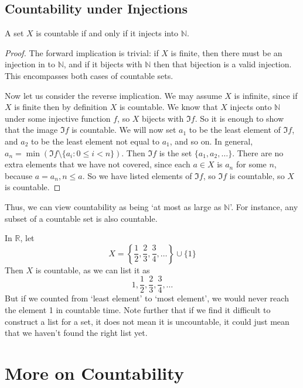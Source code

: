 \documentclass{article}
\begin{document}
\subsection{Countability under Injections}
\begin{proposition}
	A set $X$ is countable if and only if it injects into $\mathbb N$.
\end{proposition}
\begin{proof}
	The forward implication is trivial: if $X$ is finite, then there must be an injection in to $\mathbb N$, and if it bijects with $\mathbb N$ then that bijection is a valid injection. This encompasses both cases of countable sets.

	Now let us consider the reverse implication. We may assume $X$ is infinite, since if $X$ is finite then by definition $X$ is countable. We know that $X$ injects onto $\mathbb N$ under some injective function $f$, so $X$ bijects with $\Im f$. So it is enough to show that the image $\Im f$ is countable. We will now set $a_1$ to be the least element of $\Im f$, and $a_2$ to be the least element not equal to $a_1$, and so on. In general, $a_n = \min (\Im f \setminus \{ a_i : 0 \leq i < n \})$. Then $\Im f$ is the set $\{ a_1, a_2, \dots \}$. There are no extra elements that we have not covered, since each $a \in X$ is $a_n$ for some $n$, because $a=a_n, n \leq a$. So we have listed elements of $\Im f$, so $\Im f$ is countable, so $X$ is countable.
\end{proof}
Thus, we can view countability as being `at most as large as $\mathbb N$'. For instance, any subset of a countable set is also countable.

\begin{remark}
	In $\mathbb R$, let
	\[ X = \left\{ \frac{1}{2}, \frac{2}{3}, \frac{3}{4}, \dots \right\} \cup \{ 1 \} \]
	Then $X$ is countable, as we can list it as
	\[ 1, \frac{1}{2}, \frac{2}{3}, \frac{3}{4}, \dots \]
	But if we counted from `least element' to `most element', we would never reach the element 1 in countable time. Note further that if we find it difficult to construct a list for a set, it does not mean it is uncountable, it could just mean that we haven't found the right list yet.
\end{remark}

\section{More on Countability}
\end{document}
